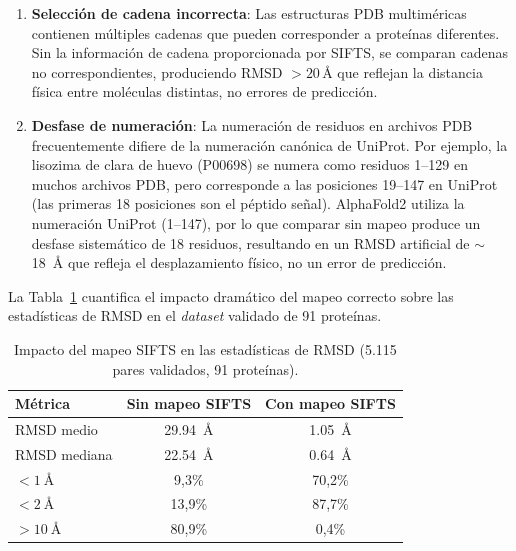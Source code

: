 \begin{enumerate}
    \item \textbf{Selecci\'on de cadena incorrecta}: Las estructuras PDB multim\'ericas
    contienen m\'ultiples cadenas que pueden corresponder a prote\'inas diferentes. Sin la
    informaci\'on de cadena proporcionada por SIFTS, se comparan cadenas no correspondientes,
    produciendo RMSD $> 20$\,\AA{} que reflejan la distancia f\'isica entre mol\'eculas
    distintas, no errores de predicci\'on.

    \item \textbf{Desfase de numeraci\'on}: La numeraci\'on de residuos en archivos PDB
    frecuentemente difiere de la numeraci\'on can\'onica de UniProt. Por ejemplo, la
    lisozima de clara de huevo (P00698) se numera como residuos 1--129 en muchos archivos
    PDB, pero corresponde a las posiciones 19--147 en UniProt (las primeras 18 posiciones
    son el p\'eptido se\~nal). AlphaFold2 utiliza la numeraci\'on UniProt (1--147), por lo
    que comparar sin mapeo produce un desfase sistem\'atico de 18 residuos, resultando en
    un RMSD artificial de $\sim$\SI{18}{\angstrom} que refleja el desplazamiento f\'isico,
    no un error de predicci\'on.
\end{enumerate}

La Tabla~\ref{tab:impacto_sifts} cuantifica el impacto dram\'atico del mapeo correcto
sobre las estad\'isticas de RMSD en el \textit{dataset} validado de 91 prote\'inas.

\begin{table}[H]
    \centering
    \caption{Impacto del mapeo SIFTS en las estad\'isticas de RMSD (5.115 pares validados, 91 prote\'inas).}
    \label{tab:impacto_sifts}
    \begin{tabular}{@{}lcc@{}}
        \toprule
        \textbf{M\'etrica} & \textbf{Sin mapeo SIFTS} & \textbf{Con mapeo SIFTS} \\
        \midrule
        RMSD medio & \SI{29,94}{\angstrom} & \SI{1,05}{\angstrom} \\
        RMSD mediana & \SI{22,54}{\angstrom} & \SI{0,64}{\angstrom} \\
        $< \SI{1}{\angstrom}$ & 9,3\% & 70,2\% \\
        $< \SI{2}{\angstrom}$ & 13,9\% & 87,7\% \\
        $> \SI{10}{\angstrom}$ & 80,9\% & 0,4\% \\
        \bottomrule
    \end{tabular}
\end{table}

